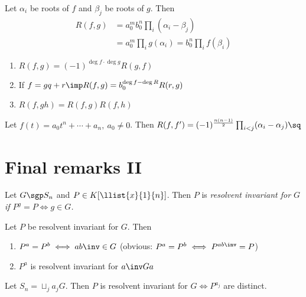 \documentclass{article}
\begin{document}
\begin{ttheorem}
  Let \( \alpha_i \) be roots of \( f \) and \( \beta_j \) be roots of \( g \).
  Then \begin{align*}
    R(f,g) &= a_0^m b_0^n \prod_i(\alpha_i-\beta_j) \\
    &= a_0^m \prod_i g(\alpha_i) = b_0^n \prod_i f(\beta_i)
  \end{align*}
\end{ttheorem}

\begin{tcorollary}
  \begin{enumerate}
    \item \( R(f,g) = (-1)^{\deg f \cdot \deg g}R(g,f) \)
    \item If \( f = gq + r \imp R(f,g) = b_0^{\deg f - \deg R} R(r,g) \)
    \item \( R(f,gh) = R(f,g)R(f,h) \)
  \end{enumerate}
\end{tcorollary}

\begin{tcorollary}
  Let \( f(t) = a_0 t^{n} + \cdots + a_n,\ a_0\neq 0 \).
  Then \( R(f,f') = (-1)^{\frac{n(n-1)}{2}}\prod_{i<j}(\alpha_i-\alpha_j)\sq \)
\end{tcorollary}

\section{Final remarks II}
\begin{tdefinition}
Let \( G\sgp S_n \) and \( P\in K[\llist{x}{1}{n}] \).
Then \( P \) is \it{resolvent invariant} for \( G \) if \( P^{g} = P \iff g\in G \).
\end{tdefinition}

\begin{tlemma}
  Let \( P \) be resolvent invariant for \( G \).
  Then \begin{enumerate}
    \item \( P^a = P^b \iff ab\inv \in G \) (obvious: \( P^a = P^b \iff P^{ab\inv} = P \))
    \item \( P^a \) is resolvent invariant for \( a\inv G a \)
  \end{enumerate}
\end{tlemma}

\begin{tcorollary}
  Let \( S_n = \sqcup_j a_j G \).
  Then \( P \) is resolvent invariant for \( G \iff P^{a_j} \) are distinct.
\end{tcorollary}
\end{document}
